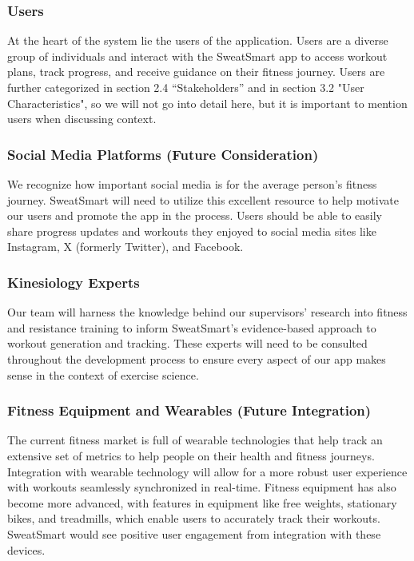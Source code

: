 \documentclass[12pt]{article}
\begin{document}
\subsubsection{Users}
At the heart of the system lie the users of the application. Users are a diverse group of individuals and interact with the SweatSmart app to access workout plans, track progress, and receive guidance on their fitness journey. Users are further categorized in section 2.4 “Stakeholders” and in section 3.2 "User Characteristics", so we will not go into detail here, but it is important to mention users when discussing context.

\subsubsection{Social Media Platforms (Future Consideration)}
We recognize how important social media is for the average person’s fitness journey. SweatSmart will need to utilize this excellent resource to help motivate our users and promote the app in the process. Users should be able to easily share progress updates and workouts they enjoyed to social media sites like Instagram, X (formerly Twitter), and Facebook.

\subsubsection{Kinesiology Experts}
Our team will harness the knowledge behind our supervisors' research into fitness and resistance training to inform SweatSmart's evidence-based approach to workout generation and tracking. These experts will need to be consulted throughout the development process to ensure every aspect of our app makes sense in the context of exercise science.

\subsubsection{Fitness Equipment and Wearables (Future Integration)}
The current fitness market is full of wearable technologies that help track an extensive set of metrics to help people on their health and fitness journeys. Integration with wearable technology will allow for a more robust user experience with workouts seamlessly synchronized in real-time. Fitness equipment has also become more advanced, with features in equipment like free weights, stationary bikes, and treadmills, which enable users to accurately track their workouts. SweatSmart would see positive user engagement from integration with these devices.
\end{document}
